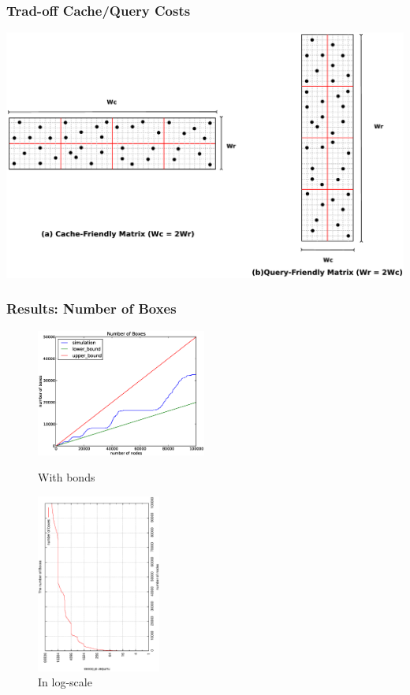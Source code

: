 \documentclass[red]{beamer}
\begin{document}
\begin{frame}
\frametitle{Trad-off Cache/Query Costs}
\begin{center}
\includegraphics[scale=0.13]{figs/asym_both.eps}
\end{center}
\end{frame}

\begin{frame}
\frametitle{Results: Number of Boxes}
\begin{figure}
\begin{minipage}{5cm}
\centering
\includegraphics[width=2.2in]{figs/no_box_100k.eps}
\caption{With bonds} 
\end{minipage}
\begin{minipage}{5cm}
\centering
\includegraphics[width=1.6in,angle=270]{figs/box_count_logy.eps}
\caption{In log-scale}
\end{minipage}
\end{figure}
\end{frame}
\end{document}
